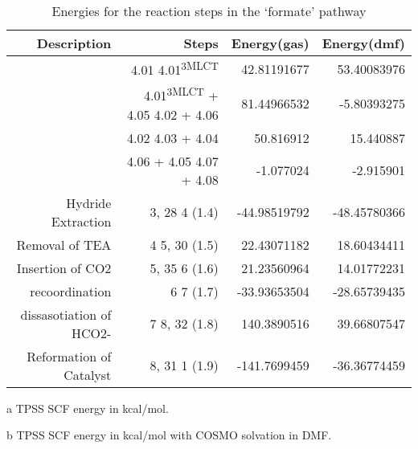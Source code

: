 \begin{table}[!htb]
\centering
 \begin{threeparttable}
  \caption{Energies for the reaction steps in the `formate' pathway}
    \begin{tabular}{rrrr}
    \toprule
    Description & Steps & Energy(gas)\tnote{a} & Energy(dmf)\tnote{b} \\
    \midrule
    & 4.01 \ce{->} 4.01\textsuperscript{3MLCT} & 42.81191677 &	53.40083976 \\
    & 4.01\textsuperscript{3MLCT} + 4.05 \ce{->} 4.02 + 4.06 & 81.44966532	& -5.80393275 \\
    & 4.02 \ce{->} 4.03 + 4.04 & 50.816912 & 15.440887 \\
    & 4.06 + 4.05 \ce{->} 4.07 + 4.08 & -1.077024 & -2.915901 \\
    \midrule
    Hydride Extraction & 3, 28 \ce{->} 4 (1.4) & -44.98519792 & -48.45780366 \\
    Removal of TEA & 4 \ce{->} 5, 30 (1.5) & 22.43071182 & 18.60434411 \\
    Insertion of CO2 & 5, 35 \ce{->} 6 (1.6) & 21.23560964 & 14.01772231 \\
    recoordination & 6 \ce{->} 7 (1.7) & -33.93653504 & -28.65739435 \\
    dissasotiation of HCO2- & 7 \ce{->} 8, 32 (1.8) & 140.3890516 & 39.66807547 \\
    Reformation of Catalyst & 8, 31 \ce{->} 1 (1.9) & -141.7699459 & -36.36774459 \\
    \bottomrule
    \end{tabular}%
    \begin{tablenotes}
    \item [a] TPSS SCF energy in kcal/mol.
    \item [b] TPSS SCF energy in kcal/mol with COSMO solvation in DMF.
    \end{tablenotes}
  \label{tab.formrxn}%
 \end{threeparttable}
\end{table}%

